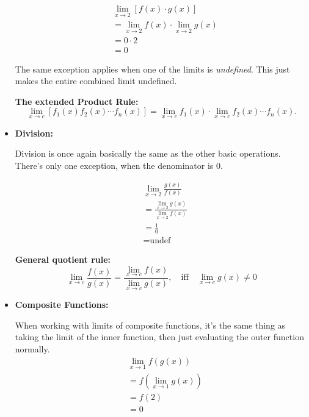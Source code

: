 \documentclass[12pt]{article}
\begin{document}
\begin{itemize}
	      \begin{align*}
		      & \lim_{x \to 2} \left[ f(x) \cdot g(x) \right]   \\
		      & = \lim_{x \to 2} f(x) \cdot \lim_{x \to 2} g(x) \\
		      & = 0 \cdot 2                                     \\
		      & = 0
	      \end{align*}

	      \indent The same exception applies when one of the limits is \textit{undefined}. This just makes the entire combined limit undefined.

	      \noindent\textbf{The extended Product Rule:}
	      \begin{equation*}
		      \lim_{x \to c} \left[ f_1(x) f_2(x) \cdots f_n(x) \right]
		      = \lim_{x \to c} f_1(x) \cdot \lim_{x \to c} f_2(x)
		      \cdots f_n(x).
	      \end{equation*}
	      \smallskip

	\item \textbf{Division:}

	      Division is once again basically the same as the other basic operations. There's only one exception, when the denominator is $0$.

	      \begin{align*}
		      & \lim_{x \to 2} \frac{g(x)}{f(x)}                  \\
		      & = \frac{\lim_{x \to 2} g(x)}{\lim_{x \to 2} f(x)} \\
		      & = \frac{1}{0}                                     \\
		      & = \text{undef}
	      \end{align*}

	      \noindent\textbf{General quotient rule:}
	      \[ \lim_{x \to c} \frac{f(x)}{g(x)} = \frac{\lim_{x \to c} f(x)}{\lim_{x \to c} g(x)}, \quad \textrm{iff} \quad \lim_{x \to c} g(x) \ne 0 \]
	      \smallskip

	\item \textbf{Composite Functions:}

	      When working with limits of composite functions, it's the same thing as taking the limit of the inner function, then just evaluating the outer function normally.
	      \begin{align*}
		      & \lim_{x \to 1} f\left(g(x)\right)     \\
		      & = f\left( \lim_{x \to 1} g(x) \right) \\
		      & = f(2)                                \\
		      & = 0
	      \end{align*}


\end{itemize}
\end{document}
